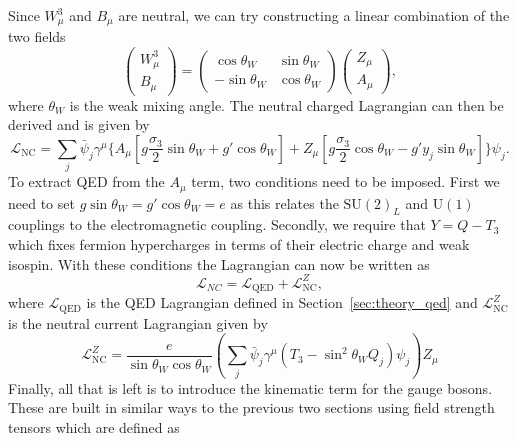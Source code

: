Since $W^{3}_{\mu}$ and $B_{\mu}$ are neutral, we can try constructing a linear combination of the two fields
\begin{equation}
  \begin{pmatrix}
    W^{3}_{\mu}\\
    B_{\mu}
  \end{pmatrix} = \begin{pmatrix}
    \cos\theta_{W} & \sin\theta_{W} \\
    -\sin\theta_{W} & \cos\theta_{W}
  \end{pmatrix}
  \begin{pmatrix}
    Z_{\mu} \\
    A_{\mu}
  \end{pmatrix},
  \label{eq:ew_mixing}
\end{equation}
where $\theta_{W}$ is the weak mixing angle. The neutral charged Lagrangian can then be derived and is given by
\begin{equation}
  \mathcal{L}_{\mathrm{NC}} = \sum_{j}\bar{\psi}_{j}\gamma^{\mu} \{A_{\mu}[g\frac{\sigma_{3}}{2}\sin{\theta_{W}} + g'\cos{\theta_{W}}] + Z_{\mu}[g\frac{\sigma_{3}}{2}\cos{\theta_{W} - g'y_{j}\sin{\theta_{W}}}] \} \psi_{j}.
  \label{eq:ew_nc_lagrangian}
\end{equation}
To extract QED from the $A_{\mu}$ term, two conditions need to be imposed. First we need to set $g\sin{\theta_{W}} = g'\cos{\theta_{W}} = e$ as this relates the $\mathrm{SU}{(2)}_{L}$ and $\mathrm{U}(1)$ couplings to the electromagnetic coupling. Secondly, we require that $Y = Q - T_{3}$ which fixes fermion hypercharges in terms of their electric charge and weak isospin. With these conditions the Lagrangian can now be written as
\begin{equation}
  \mathcal{L}_{NC} = \mathcal{L}_{\mathrm{QED}} + \mathcal{L}_{\mathrm{NC}}^{Z}, 
\end{equation}
where $\mathcal{L}_{\mathrm{QED}}$ is the QED Lagrangian defined in Section~\ref{sec:theory_qed} and $\mathcal{L}_{\mathrm{NC}}^{Z}$ is the neutral current Lagrangian given by
\begin{equation}
  \mathcal{L}_{\mathrm{NC}}^{Z} = \frac{e}{\sin{\theta_{W}}\cos{\theta_{W}}} \left(\sum_{j}\bar{\psi}_{j}\gamma^{\mu}(T_{3} - \sin^2{\theta_{W}}Q_{j})\psi_{j}\right)Z_{\mu}
  \label{eq:ew_nc_lagrangian_z}
\end{equation}
Finally, all that is left is to introduce the kinematic term for the gauge bosons. These are built in similar ways to the previous two sections using field strength tensors which are defined as
